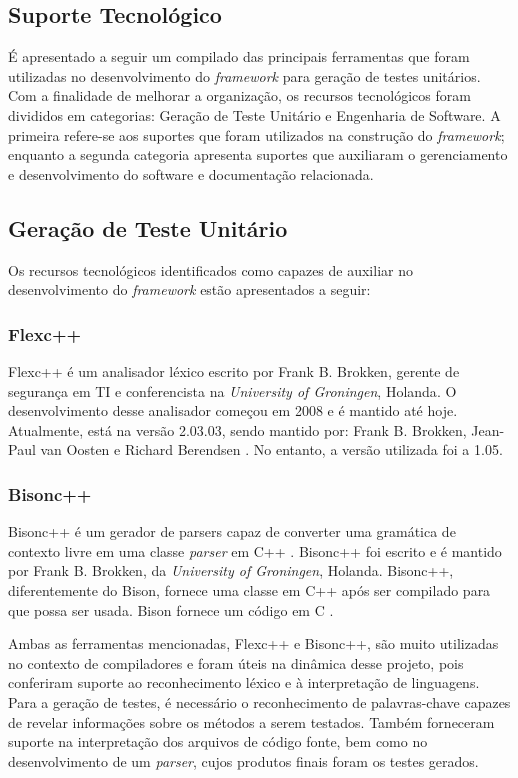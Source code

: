 \begin{apendicesenv}

\chapter[Suporte Tecnológico]{Suporte Tecnológico}
É apresentado a seguir um compilado das principais ferramentas que foram utilizadas no desenvolvimento do \textit{framework} para geração de testes unitários. Com a finalidade de melhorar a organização, os recursos tecnológicos foram divididos em categorias: Geração de Teste Unitário e Engenharia de Software. A primeira refere-se aos suportes que foram utilizados na construção do \textit{framework}; enquanto a segunda categoria apresenta suportes que auxiliaram o gerenciamento e desenvolvimento do software e documentação relacionada.

\section{Geração de Teste Unitário} \label{suporteGeracao}
Os recursos tecnológicos identificados como capazes de auxiliar no desenvolvimento do \textit{framework} estão apresentados a seguir:

\subsection{Flexc++}
Flexc++ é um analisador léxico escrito por Frank B. Brokken, gerente de segurança em TI e conferencista na \textit{University of Groningen}, Holanda\cite{flexcpp2015}. O desenvolvimento desse analisador começou em 2008 e é mantido até hoje. Atualmente, está na versão 2.03.03, sendo mantido por: Frank B. Brokken, Jean-Paul van Oosten e Richard Berendsen \cite{flexcpp2015}. No entanto, a versão utilizada foi a 1.05. 
 
\subsection{Bisonc++}
Bisonc++ é um gerador de parsers capaz de converter uma gramática de contexto livre em uma classe \textit{parser} em C++ \cite{bisoncpp2015}. Bisonc++ foi escrito e é mantido por Frank B. Brokken, da \textit{University of Groningen}, Holanda. Bisonc++, diferentemente do Bison, fornece uma classe em C++ após ser compilado para que possa ser usada. Bison fornece um código em C \cite{bisoncpp2015}.
\par
\indent Ambas as ferramentas mencionadas, Flexc++ e Bisonc++, são muito utilizadas no contexto de compiladores \cite{aaby2004} e foram úteis na dinâmica desse projeto, pois conferiram suporte ao reconhecimento léxico e à interpretação de linguagens. Para a geração de testes, é necessário o reconhecimento de palavras-chave capazes de revelar informações sobre os métodos a serem testados. Também forneceram suporte na interpretação dos arquivos de código fonte, bem como no desenvolvimento de um \textit{parser}, cujos produtos finais foram os testes gerados.


\end{apendicesenv}
